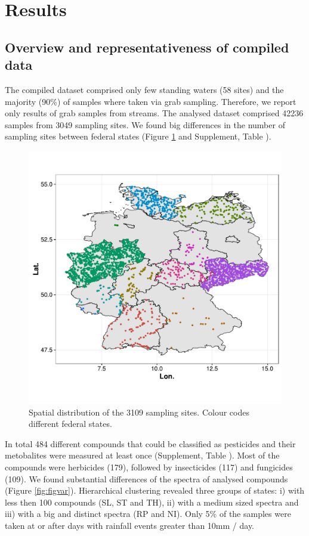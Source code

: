 \documentclass[journal=esthag,manuscript=article]{achemso}
\begin{document}
\section{Results}
\subsection{Overview and representativeness of compiled data}

The compiled dataset comprised only few standing waters (58 sites) and the majority (90\%) of samples where taken via grab sampling.  %
Therefore, we report only results of grab samples from streams. 
The analysed dataset comprised 42236 samples from 3049 sampling sites.  %
We found big differences in the number of sampling sites between federal states (Figure \ref{fig:fig1} and Supplement, Table ).

\begin{figure}
  \includegraphics[width=.7\textwidth]{fig/fig1.pdf}
  \caption{Spatial distribution of the 3109 sampling sites. Colour codes different federal states.}
  \label{fig:fig1}
\end{figure}

In total 484 different compounds that could be classified as pesticides and their metobalites were measured at least once (Supplement, Table ). 
Most of the compounds were herbicides (179), followed by insecticides (117) and fungicides (109).
We found substantial differences of the spectra of analysed compounds (Figure \ref{fig:figvar}).
Hierarchical clustering revealed three groups of states:
i) with less then 100 compounds (SL, ST and TH), ii) with a medium sized spectra and iii) with a big and distinct spectra (RP and NI).
Only 5\% of the samples were taken at or after days with rainfall events greater than 10mm / day.
\end{document}
